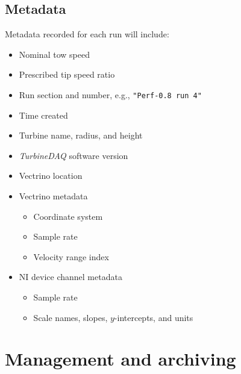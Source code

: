 \documentclass[12pt,letterpaper]{scrreprt}
\begin{document}
\subsection{Metadata}

Metadata recorded for each run will include:

\begin{itemize}

	\item Nominal tow speed
	
	\item Prescribed tip speed ratio
	
	\item Run section and number, e.g., \texttt{"Perf-0.8 run 4"}
	
	\item Time created
	
	\item Turbine name, radius, and height
	
	\item \textit{TurbineDAQ} software version
	
	\item Vectrino location
	
	\item Vectrino metadata
	
		\begin{itemize}
		
			\item Coordinate system
			
			\item Sample rate
			
			\item Velocity range index
		
		\end{itemize}
		
	\item NI device channel metadata
	
		\begin{itemize}
		
		\item Sample rate
		
		\item Scale names, slopes, $y$-intercepts, and units 
		
		\end{itemize}

\end{itemize}


\section{Management and archiving}
\end{document}
